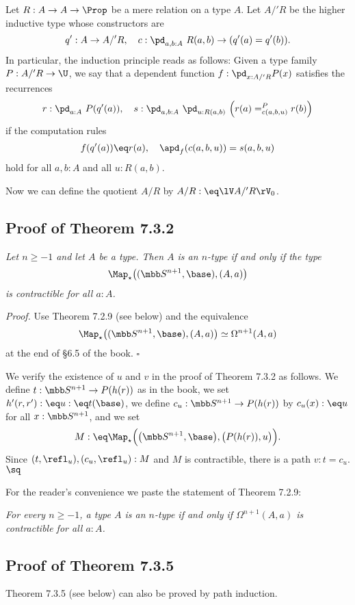 \documentclass[12pt]{article}
\begin{document}
Let $R:A\to A\to\Prop$ be a mere relation on a type $A$. Let $A/'R$ be the higher inductive type whose constructors are 
$$
q':A\to A/'R,\quad c:\pd_{a,b:A}\ R(a,b)\to(q'(a)=q'(b)).
$$ 
In particular, the induction principle reads as follows: Given a type family $P:A/'R\to\U$, we say that a dependent function $f:\pd_{x:A/'R}P(x)$ satisfies the recurrences 
$$
r:\pd_{a:A}\ P(q'(a)),\quad s:\pd_{a,b:A}\ \pd_{u:R(a,b)}\ \Big(r(a)=^P_{c(a,b,u)}r(b)\Big)
$$ 
if the computation rules 
$$
f(q'(a))\eq r(a),\quad\apd_f(c(a,b,u))=s(a,b,u)
$$ 
hold for all $a,b:A$ and all $u:R(a,b)$. 

Now we can define the quotient $A/R$ by $A/R:\eq\lV A/'R\rV_0$. 


\subsection{Proof of Theorem 7.3.2}

 \emph{Let $n\ge-1$ and let $A$ be a type. Then $A$ is an $n$-type if and only if the type 
$$
\Map_\star\big((\mbb S^{n+1},\base),(A,a)\big)
$$ 
is contractible for all $a:A$.}

\nn\emph{Proof.} Use Theorem 7.2.9 (see below) and the equivalence 
$$
\Map_\star\big((\mbb S^{n+1},\base),(A,a)\big)\simeq\Omega^{n+1}(A,a)
$$ 
at the end of \S6.5 of the book. $\square$

We verify the existence of $u$ and $v$ in the proof of Theorem 7.3.2 as follows. We define $t:\mbb S^{n+1}\to P(h(r))$ as in the book, we set $h'(r,r'):\eq u:\eq t(\base)$, we define $c_u:\mbb S^{n+1}\to P(h(r))$ by $c_u(x):\eq u$ for all $x:\mbb S^{n+1}$, and we set
$$
M:\eq\Map_\star\Big(\big(\mbb S^{n+1},\base\big),\big(P(h(r)),u\big)\Big).
$$ 
Since $(t,\refl_u),(c_u,\refl_u):M$ and $M$ is contractible, there is a path $v:t=c_u$. $\sq$

For the reader's convenience we paste the statement of Theorem 7.2.9:

\nn{} \emph{For every $n\ge-1$, a type $A$ is an $n$-type if and only if $\Omega^{n+1}(A,a)$ is contractible for all $a:A$.}


\subsection{Proof of Theorem 7.3.5}

Theorem 7.3.5 (see below) can also be proved by path induction.
\end{document}
